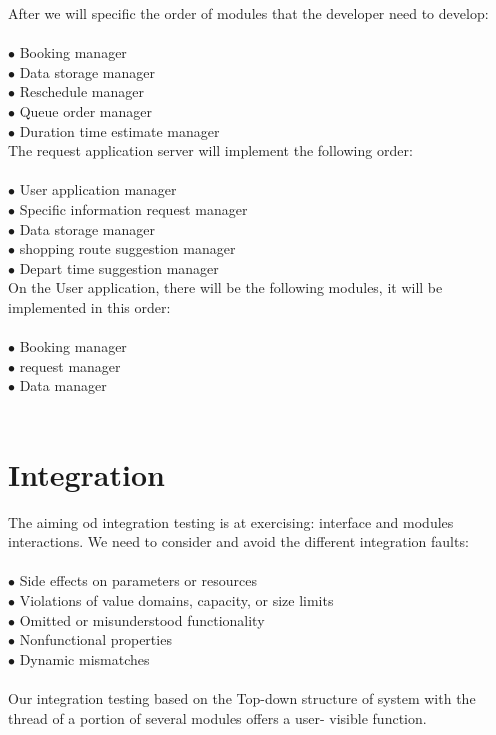 \documentclass[a4paper,12pt]{report}
\begin{document}
After we will specific the order of modules that the developer need to develop:~\\
~\\
$\bullet$ Booking manager~\\
$\bullet$ Data storage manager~\\
$\bullet$ Reschedule manager~\\
$\bullet$ Queue order manager~\\
$\bullet$ Duration time estimate manager~\\


The request application server will implement the following order:~\\
~\\
$\bullet$ User application manager~\\
$\bullet$ Specific information request manager~\\
$\bullet$ Data storage manager~\\
$\bullet$ shopping route suggestion manager~\\
$\bullet$ Depart time suggestion manager~\\

On the User application, there will be the following modules,  it will be implemented in this order:~\\
~\\
$\bullet$ Booking manager~\\
$\bullet$ request manager~\\
$\bullet$ Data manager~\\
~\\
\section{Integration}
The aiming od integration testing is at exercising: interface and modules interactions. We need to consider and avoid the different integration faults:~\\
~\\
$\bullet$ Side effects on parameters or resources~\\
$\bullet$ Violations of value domains, capacity, or size limits~\\
$\bullet$ Omitted or misunderstood functionality~\\
$\bullet$ Nonfunctional properties~\\
$\bullet$ Dynamic mismatches\cite{SlidesSE2}~\\
~\\
Our integration testing based on the Top-down structure of system with the thread of a portion of several modules offers a user- visible function.~\\
~\\
\end{document}
